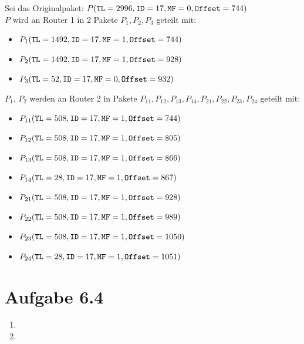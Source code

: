 \documentclass[12pt, a4paper]{article}
\begin{document}
Sei das Originalpaket: $P(\verb|TL|=2996, \verb|ID|=17, \verb|MF|=0, \verb|Offset|=744)$\\

$P$ wird an Router 1 in 2 Pakete $P_1, P_2, P_3$ geteilt mit:

\begin{itemize}
	\item	$P_1(\verb|TL|=1492, \verb|ID|=17, \verb|MF|=1, \verb|Offset|=744)$
	\item	$P_2(\verb|TL|=1492, \verb|ID|=17, \verb|MF|=1, \verb|Offset|=928)$
	\item	$P_3(\verb|TL|=52, \verb|ID|=17, \verb|MF|=0, \verb|Offset|=932)$
\end{itemize}

$P_1$, $P_2$ werden an Router 2 in Pakete $P_{11}, P_{12}, P_{13}, P_{14}, P_{21}, P_{22}, P_{23}, P_{24}$ geteilt mit:

\begin{itemize}
	\item	$P_{11}(\verb|TL|=508, \verb|ID|=17, \verb|MF|=1, \verb|Offset|=744)$
	\item	$P_{12}(\verb|TL|=508, \verb|ID|=17, \verb|MF|=1, \verb|Offset|=805)$
	\item	$P_{13}(\verb|TL|=508, \verb|ID|=17, \verb|MF|=1, \verb|Offset|=866)$
	\item	$P_{14}(\verb|TL|=28, \verb|ID|=17, \verb|MF|=1, \verb|Offset|=867)$
\\
	\item	$P_{21}(\verb|TL|=508, \verb|ID|=17, \verb|MF|=1, \verb|Offset|=928)$
	\item	$P_{22}(\verb|TL|=508, \verb|ID|=17, \verb|MF|=1, \verb|Offset|=989)$
	\item	$P_{23}(\verb|TL|=508, \verb|ID|=17, \verb|MF|=1, \verb|Offset|=1050)$
	\item	$P_{24}(\verb|TL|=28, \verb|ID|=17, \verb|MF|=1, \verb|Offset|=1051)$
\end{itemize}


\newpage


\section*{Aufgabe 6.4}
\begin{enumerate}[label=\alph*)]
	\item	
	\item	
\end{enumerate}


\newpage
\end{document}
